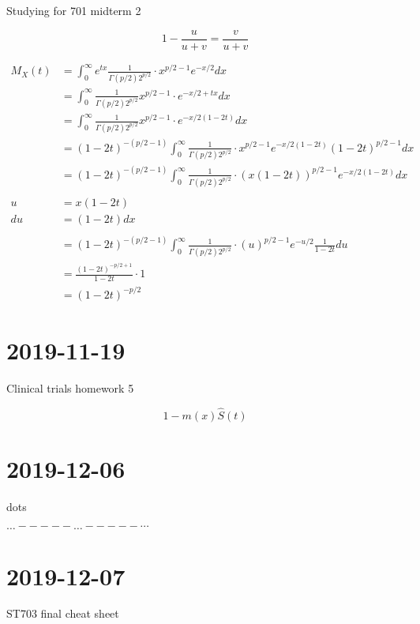 \documentclass[]{article}
\begin{document}
Studying for 701 midterm 2

$$
1 - \frac{ u }{ u+v } = \frac{ v }{ u+v }
$$



\begin{align*}
	M_X(t) & = \int_{0} ^{\infty} e^{t x} \frac{ 1 }{ \Gamma(p/2) 2^{p/2}} \cdot  x^{p/2-1}  e^{-x/2} dx\\
		& = \int_{0} ^{\infty} \frac{ 1 }{ \Gamma(p/2) 2^{p/2}}  x^{p/2-1} \cdot e^{-x/2 + tx} dx\\
		& = \int_{0} ^{\infty} \frac{ 1 }{ \Gamma(p/2) 2^{p/2}}  x^{p/2-1} \cdot e^{-x/2 (1-2t)} dx\\
		& = (1-2t)^{-(p/2-1)}  \int_{0} ^{\infty} \frac{ 1 }{ \Gamma(p/2) 2^{p/2}} \cdot x^{p/2-1}  e^{-x/2 (1-2t)}  (1-2t)^{p/2-1} dx\\
		& = (1-2t)^{-(p/2-1)}  \int_{0} ^{\infty} \frac{ 1 }{ \Gamma(p/2) 2^{p/2}} \cdot (x (1-2t))^{p/2-1}  e^{-x/2 (1-2t)}  dx\\ \\
		u & = x(1-2t) \\
		du & = (1-2t) dx \\ \\
		& = (1-2t)^{-(p/2-1)}  \int_{0} ^{\infty} \frac{ 1 }{ \Gamma(p/2) 2^{p/2}} \cdot (u)^{p/2-1}  e^{-u/2 } \frac{ 1 }{ 1-2t }  du\\ 
		& = \frac{ (1-2t)^{-p/2 + 1} }{ 1-2t } \cdot 1 \\
		& = (1-2t)^{-p/2}
\end{align*}




\section*{2019-11-19}
Clinical trials homework 5

$$
1-m(x)    \hat{S}(t)
$$



\section*{2019-12-06}
dots

$\dots - - - - - \hdots - - - - - \cdots$


\section*{2019-12-07}
ST703 final cheat sheet
\end{document}
